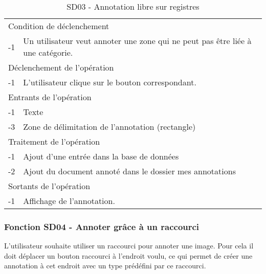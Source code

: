 \documentclass[a4paper]{article}
\begin{document}
\begin{table}[H]
  \centering
   \small
	\begin{tabular}{|c|p{12cm}|}
   		\hline
   			\rowcolor{lightgray}\multicolumn{2}{|c|}{\textbf{SD03 - Annotation libre sur registres}} \\
   		\hline
   			\multicolumn{2}{|l|}{Condition de d\'eclenchement} \\
   		\hline
   		-1 & Un utilisateur veut annoter une zone qui ne peut pas \^etre li\'ee \`a une cat\'egorie. \\
   		\hline
   			\multicolumn{2}{|l|}{D\'eclenchement de l'op\'eration} \\
   		\hline
   			-1 & L'utilisateur clique sur le bouton correspondant. \\
   		\hline
   			\multicolumn{2}{|l|}{Entrants de l'op\'eration} \\
   		\hline
   			-1 & Texte \\
        	-3 & Zone de d\'elimitation de l'annotation (rectangle) \\
   		\hline
   			\multicolumn{2}{|l|}{Traitement de l'op\'eration} \\
  		\hline
   			-1 & Ajout d'une entr\'ee dans la base de donn\'ees \\
            -2 & Ajout du document annot\'e dans le dossier mes annotations \\
   		\hline
   			\multicolumn{2}{|l|}{Sortants de l'op\'eration} \\
   		\hline
   			-1 & Affichage de l'annotation. \\
   		\hline
	\end{tabular}
  \caption{SD03 - Annotation libre sur registres}
  \normalsize
  \label{tab:annotation_libre}
\end{table}

\subsubsection{Fonction SD04 - Annoter grâce à un raccourci}
L’utilisateur souhaite utiliser un raccourci pour annoter une image. Pour cela il doit déplacer un bouton raccourci à l’endroit voulu, ce qui permet de créer une annotation à cet endroit avec un type prédéfini par ce raccourci.\\
\end{document}
